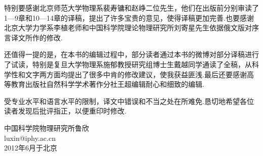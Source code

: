 特别要感谢北京师范大学物理系裴寿镛和赵峥二位先生，他们在出版前分别审读了1—9章和10—14章的译稿，提出了许多宝贵的意见，使得译稿更加完善.也要感谢北京大学力学系李植老师和中国科学院理论物理研究所刘寄星先生依据俄文版对序言译文所作的修改.

还值得一提的是，在本书的编辑过程中，部分读者通过本书的微博对部分译稿进行了试读，特别是复旦大学物理系施郁教授研究组博士生戴越同学通读了全稿，从科学性和文字两方面均提出了很多中肯的修改建议，使我获益匪浅.最后还要感谢高等教育出版社自然科学学术著作分社王超编辑耐心和细致的编辑.

受专业水平和语言水平的限制，译文中错误和不当之处在所难免.恳切地希望各位读者发现后批评指正，以便重印时修改.

\begin{flushright}
中国科学院物理研究所\quad 鲁欣\\
luxin@iphy.ac.cn\\
2012年6月于北京
\end{flushright}
